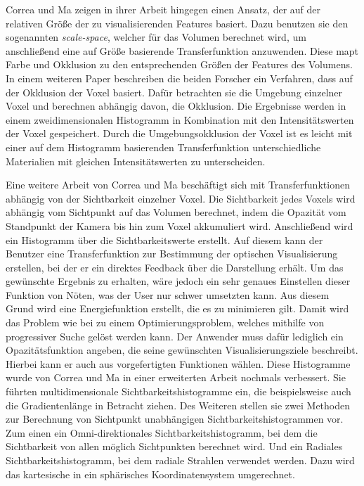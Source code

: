 Correa und Ma zeigen in ihrer Arbeit \cite{correa2008size} hingegen einen Ansatz, der auf der relativen Größe der zu visualisierenden Features basiert.
\newline
Dazu benutzen sie den sogenannten \textit{scale-space}, welcher für das Volumen berechnet wird, um anschließend eine auf Größe basierende Transferfunktion anzuwenden. Diese mapt Farbe und Okklusion zu den entsprechenden Größen der Features des Volumens.
\newline
In einem weiteren Paper \cite{correa2009occlusion} beschreiben die beiden Forscher ein Verfahren, dass auf der Okklusion der Voxel basiert.
\newline
Dafür betrachten sie die Umgebung einzelner Voxel und berechnen abhängig davon, die Okklusion. Die Ergebnisse werden in einem zweidimensionalen Histogramm in Kombination mit den Intensitätswerten der Voxel gespeichert. Durch die Umgebungsokklusion der Voxel ist es leicht mit einer auf dem Histogramm basierenden Transferfunktion unterschiedliche Materialien mit gleichen Intensitätswerten zu unterscheiden.


Eine weitere Arbeit \cite{correa2009visibility} von Correa und Ma beschäftigt sich mit Transferfunktionen abhängig von der Sichtbarkeit einzelner Voxel.
\newline
Die Sichtbarkeit jedes Voxels wird abhängig vom Sichtpunkt auf das Volumen berechnet, indem die Opazität vom Standpunkt der Kamera bis hin zum Voxel akkumuliert wird. Anschließend wird ein Histogramm über die Sichtbarkeitswerte erstellt. Auf diesem kann der Benutzer eine Transferfunktion zur Bestimmung der optischen Visualisierung erstellen, bei der er ein direktes Feedback über die Darstellung erhält. Um das gewünschte Ergebnis zu erhalten, wäre jedoch ein sehr genaues Einstellen dieser Funktion von Nöten, was der User nur schwer umsetzten kann.
\newline
Aus diesem Grund wird eine Energiefunktion erstellt, die es zu minimieren gilt. Damit wird das Problem wie bei \cite{wu2007interactive} zu einem Optimierungsproblem, welches mithilfe von progressiver Suche gelöst werden kann. Der Anwender muss dafür lediglich ein Opazitätsfunktion angeben, die seine gewünschten Visualisierungsziele beschreibt. Hierbei kann er auch aus vorgefertigten Funktionen wählen.
\newline
Diese Histogramme wurde von Correa und Ma in einer erweiterten Arbeit \cite{correa2011visibility} nochmals verbessert. Sie führten multidimensionale Sichtbarkeitshistogramme ein, die beispielsweise auch die Gradientenlänge in Betracht ziehen. Des Weiteren stellen sie zwei Methoden zur Berechnung von Sichtpunkt unabhängigen Sichtbarkeitshistogrammen vor. Zum einen ein Omni-direktionales Sichtbarkeitshistogramm, bei dem die Sichtbarkeit von allen möglich Sichtpunkten berechnet wird. Und ein Radiales Sichtbarkeitshistogramm, bei dem radiale Strahlen verwendet werden. Dazu wird das kartesische in ein sphärisches Koordinatensystem umgerechnet.



